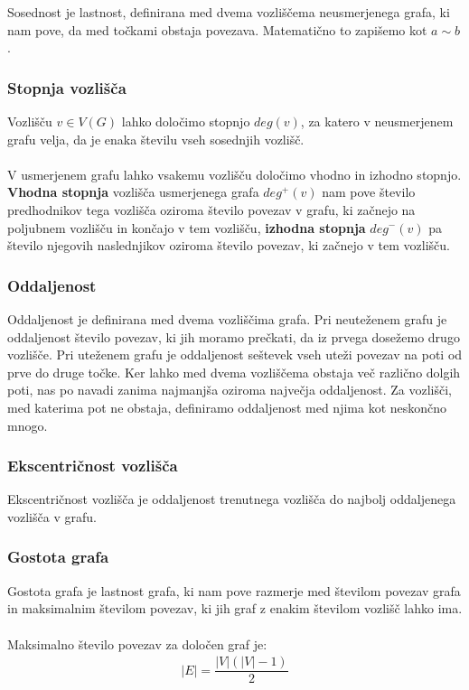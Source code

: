 \documentclass[11pt]{article}
\begin{document}
Sosednost je lastnost, definirana med dvema vozliščema neusmerjenega grafa, ki nam pove, da med točkami obstaja povezava. Matematično to zapišemo kot $a \sim b$.

\subsubsection{Stopnja vozlišča}

Vozlišču $v \in V(G)$ lahko določimo stopnjo $deg(v)$, za katero v neusmerjenem grafu velja, da je enaka številu vseh sosednjih vozlišč.
\\ \\
V usmerjenem grafu lahko vsakemu vozlišču določimo vhodno in izhodno stopnjo. \textbf{Vhodna stopnja} vozlišča usmerjenega grafa $deg^+(v)$ nam pove število predhodnikov tega vozlišča oziroma število povezav v grafu, ki začnejo na poljubnem vozlišču in končajo v tem vozlišču, \textbf{izhodna stopnja} $deg^-(v)$ pa število njegovih naslednjikov oziroma število povezav, ki začnejo v tem vozlišču.

\subsubsection{Oddaljenost}

Oddaljenost je definirana med dvema vozliščima grafa. Pri neuteženem grafu je oddaljenost število povezav, ki jih moramo prečkati, da iz prvega dosežemo drugo vozlišče. Pri uteženem grafu je oddaljenost seštevek vseh uteži povezav na poti od prve do druge točke. Ker lahko med dvema vozliščema obstaja več različno dolgih poti, nas po navadi zanima najmanjša oziroma največja oddaljenost. Za vozlišči, med katerima pot ne obstaja, definiramo oddaljenost med njima kot neskončno mnogo.

\subsubsection{Ekscentričnost vozlišča}

Ekscentričnost vozlišča je oddaljenost trenutnega vozlišča do najbolj oddaljenega vozlišča v grafu. \cite{eks}

\subsubsection{Gostota grafa}

Gostota grafa je lastnost grafa, ki nam pove razmerje med številom povezav grafa in maksimalnim številom povezav, ki jih graf z enakim številom vozlišč lahko ima.
\\ \\
Maksimalno število povezav za določen graf je:
\begin{gather*}
	\vert E \vert = \dfrac{\vert V \vert (\vert V \vert - 1)}{2}
\end{gather*}
\end{document}
